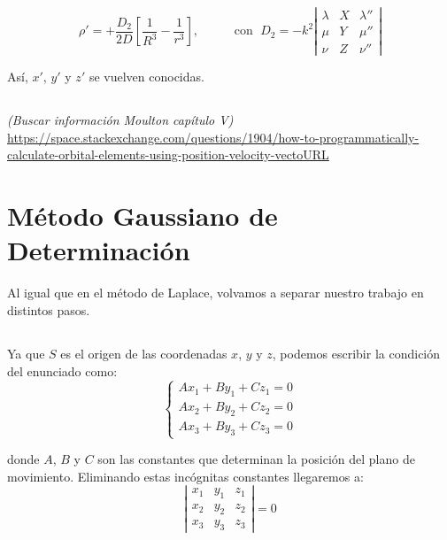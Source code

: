 \documentclass[11pt]{article}
\begin{document}
\[
\rho'=+\frac{D_2}{2D}[\frac{1}{R^3}-\frac{1}{r^3}],
\; \; \; \; \; \; \; \; \; \text{ con } \;
D_2 = -k^2
\left|
\begin{array}{ccc}
\lambda & X & \lambda''\\
\mu & Y & \mu''\\
\nu & Z & \nu''
\end{array}
\right|
\]

Así, $x'$, $y'$ y $z'$ se vuelven conocidas.\\

\subsection{}
\textit{(Buscar información Moulton capítulo V)}\\

\url{https://space.stackexchange.com/questions/1904/how-to-programmatically-calculate-orbital-elements-using-position-velocity-vectoURL}




\section{Método Gaussiano de Determinación}
Al igual que en el método de Laplace, volvamos a separar nuestro trabajo en distintos pasos.\\

\subsection{}
Ya que $S$ es el origen de las coordenadas $x$, $y$ y $z$, podemos escribir la condición del enunciado como:
\[
\left\{
\begin{array}{l}
	Ax_1+By_1+Cz_1=0\\
	Ax_2+By_2+Cz_2=0\\
	Ax_3+By_3+Cz_3=0
\end{array}
\right.
\]

\noindent donde $A$, $B$ y $C$ son las constantes que determinan la posición del plano de movimiento. Eliminando estas incógnitas constantes llegaremos a:
\[
\left|
\begin{array}{ccc}
	x_1 & y_1 & z_1\\
	x_2 & y_2 & z_2\\
	x_3 & y_3 & z_3
\end{array}
\right|
=0
\]
\end{document}
